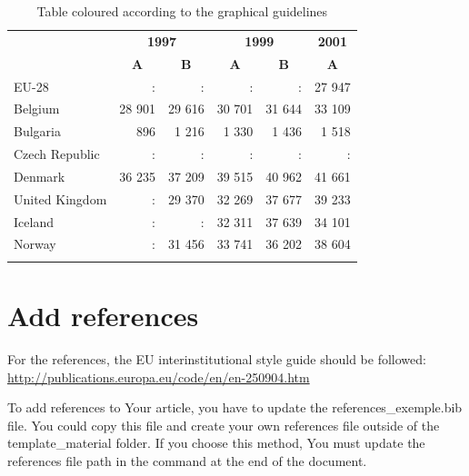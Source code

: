 \documentclass[Theme1]{{template_material/eurostat}}
\begin{document}
\begin{table}[h]
\caption{Table coloured according to the graphical guidelines\label{tab8}}
\begin{tabular}{l|r|r|r|r|r}
\hlinesep
\rowcolor{TH20p}
\multirow{2}{*}{} & \multicolumn{2}{c|}{\bf 1997} & \multicolumn{2}{c|}{\bf 1999} & \multicolumn{1}{c}{\bf 2001}   \\ \cline{2-6}
\rowcolor{TH20p}
                  & \multicolumn{1}{c}{\bf A}   & \multicolumn{1}{c}{\bf B} & \multicolumn{1}{c}{\bf A} & \multicolumn{1}{c}{\bf B} & \multicolumn{1}{c}{\bf A}      \\ \hlinesep
\rowcolor{TH30p}
EU-28             & :           & :           & :           & :           & 27 947 \\ \hlinesep
Belgium           & 28 901      & 29 616      & 30 701      & 31 644      & 33 109 \\ \hline
Bulgaria          & 896         & 1 216       & 1 330       & 1 436       & 1 518  \\ \hline
Czech Republic    & :           & :           & :           & :           & :      \\ \hline
Denmark           & 36 235      & 37 209      & 39 515      & 40 962      & 41 661 \\ \hline
United Kingdom    & :           & 29 370      & 32 269      & 37 677      & 39 233 \\ \hlinesep
Iceland           & :           & :           & 32 311      & 37 639      & 34 101 \\ \hline
Norway            & :           & 31 456      & 33 741      & 36 202      & 38 604 \\ \hlinesep
\end{tabular}
\end{table}

\newpage
\section{Add references}

For the references, the EU interinstitutional style guide should be followed: \url{http://publications.europa.eu/code/en/en-250904.htm}

To add references to Your article, you have to update the references\_exemple.bib file. You could copy this file and create your own references file outside of the template\_material folder. If you choose this method, You must update the references file path in the  command at the end of the document. 
\end{document}
